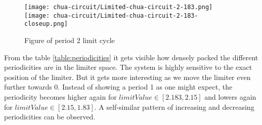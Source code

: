 \documentclass[main]{subfiles}
\begin{document}
\hspace*{-0.2\textwidth}
\begin{minipage}{1.3\textwidth}
\begin{figure}[H]
\centering
\texttt{[image: chua-circuit/Limited-chua-circuit-2-183.png]}
\texttt{[image: chua-circuit/Limited-chua-circuit-2-183-closeup.png]}
\caption[Figure of period 3 limit cycle]{Figure of period 2 limit cycle}
\label{figure:chaotictrajectories}
\end{figure}
\end{minipage}

From the table \ref{table:periodicities} it gets visible how densely packed the different periodicities are in the limiter space. The system is highly sensitive to the exact position of the limiter. But it gets more interesting as we move the limiter even further towards 0. Instead of showing a period 1 as one might expect, the periodicity becomes higher again for \(limitValue \in [2.183,2.15]\) and lowers again for \(limitValue \in [2.15,1.83]\). A self-similar pattern of increasing and decreasing periodicities can be observed.

\end{document}
